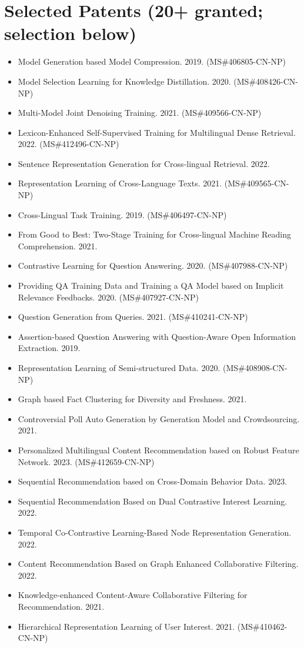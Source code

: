 \documentclass[10.5pt,letterpaper]{article}
\begin{document}
\section*{Selected Patents (20+ granted; selection below)}
\begin{itemize}[leftmargin=1.1em, itemsep=0pt, topsep=1pt, parsep=0pt]
  \item Model Generation based Model Compression. 2019. (MS\#406805-CN-NP)
  \item Model Selection Learning for Knowledge Distillation. 2020. (MS\#408426-CN-NP)
  \item Multi-Model Joint Denoising Training. 2021. (MS\#409566-CN-NP)
  \item Lexicon-Enhanced Self-Supervised Training for Multilingual Dense Retrieval. 2022. (MS\#412496-CN-NP)
  \item Sentence Representation Generation for Cross-lingual Retrieval. 2022.
  \item Representation Learning of Cross-Language Texts. 2021. (MS\#409565-CN-NP)
  \item Cross-Lingual Task Training. 2019. (MS\#406497-CN-NP)
  \item From Good to Best: Two-Stage Training for Cross-lingual Machine Reading Comprehension. 2021.
  \item Contrastive Learning for Question Answering. 2020. (MS\#407988-CN-NP)
  \item Providing QA Training Data and Training a QA Model based on Implicit Relevance Feedbacks. 2020. (MS\#407927-CN-NP)
  \item Question Generation from Queries. 2021. (MS\#410241-CN-NP)
  \item Assertion-based Question Answering with Question-Aware Open Information Extraction. 2019.
  \item Representation Learning of Semi-structured Data. 2020. (MS\#408908-CN-NP)
  \item Graph based Fact Clustering for Diversity and Freshness. 2021.
  \item Controversial Poll Auto Generation by Generation Model and Crowdsourcing. 2021.
  \item Personalized Multilingual Content Recommendation based on Robust Feature Network. 2023. (MS\#412659-CN-NP)
  \item Sequential Recommendation based on Cross-Domain Behavior Data. 2023.
  \item Sequential Recommendation Based on Dual Contrastive Interest Learning. 2022.
  \item Temporal Co-Contrastive Learning-Based Node Representation Generation. 2022.
  \item Content Recommendation Based on Graph Enhanced Collaborative Filtering. 2022.
  \item Knowledge-enhanced Content-Aware Collaborative Filtering for Recommendation. 2021.
  \item Hierarchical Representation Learning of User Interest. 2021. (MS\#410462-CN-NP)
\end{itemize}
\end{document}
